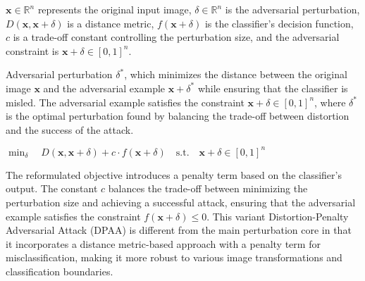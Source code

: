 $ \mathbf{x} \in \mathbb{R}^n $ represents the original input image,  
$ \delta \in \mathbb{R}^n $ is the adversarial perturbation,  
$ D(\mathbf{x}, \mathbf{x} + \delta) $ is a distance metric,  
$ f(\mathbf{x} + \delta) $ is the classifier's decision function,  
$ c $ is a trade-off constant controlling the perturbation size,  
and the adversarial constraint is $ \mathbf{x} + \delta \in [0, 1]^n $.  

Adversarial perturbation $\delta^*$, which minimizes the distance between the original image $\mathbf{x}$ and the adversarial example $\mathbf{x} + \delta^*$ while ensuring that the classifier is misled. The adversarial example satisfies the constraint $\mathbf{x} + \delta \in [0, 1]^n$, where $\delta^*$ is the optimal perturbation found by balancing the trade-off between distortion and the success of the attack.

$\min_{\delta} \quad D(\mathbf{x}, \mathbf{x} + \delta) + c \cdot f(\mathbf{x} + \delta) \quad \text{s.t.} \quad \mathbf{x} + \delta \in [0, 1]^n$

The reformulated objective introduces a penalty term based on the classifier’s output. The constant $c$ balances the trade-off between minimizing the perturbation size and achieving a successful attack, ensuring that the adversarial example satisfies the constraint $f(\mathbf{x} + \delta) \leq 0$. This variant Distortion-Penalty Adversarial Attack (DPAA) is different from the main perturbation core in that it incorporates a distance metric-based approach with a penalty term for misclassification, making it more robust to various image transformations and classification boundaries.